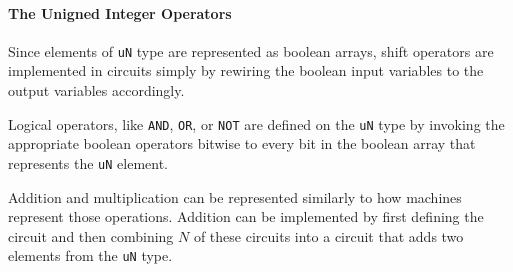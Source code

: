 \paragraph{The Unigned Integer Operators} Since elements of \texttt{uN} type are represented as boolean arrays, shift operators are implemented in circuits simply by rewiring the boolean input variables to the output variables accordingly. 

Logical operators, like \texttt{AND}, \texttt{OR}, or \texttt{NOT} are defined on the \texttt{uN} type by invoking the appropriate boolean operators bitwise to every bit in the boolean array that represents the \texttt{uN} element.

Addition and multiplication can be represented similarly to how machines represent those operations. Addition can be implemented by first defining the  circuit and then combining $N$ of  these circuits into a circuit that adds two elements from the \texttt{uN} type.
